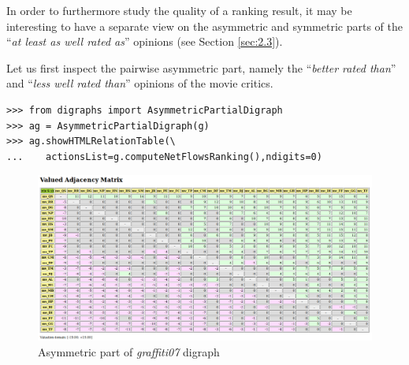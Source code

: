 In order to furthermore study the quality of a ranking result, it may be interesting to have a separate view on the asymmetric and symmetric parts of the ``\emph{at least as well rated as}'' opinions (see Section \vref{sec:2.3}).

Let us first inspect the pairwise asymmetric part, namely the ``\emph{better rated than}'' and ``\emph{less well rated than}'' opinions of the movie critics. 
\begin{lstlisting}
>>> from digraphs import AsymmetricPartialDigraph
>>> ag = AsymmetricPartialDigraph(g)
>>> ag.showHTMLRelationTable(\
...    actionsList=g.computeNetFlowsRanking(),ndigits=0)
\end{lstlisting}
\begin{figure}[h]
\includegraphics[width=12cm]{Figures/asymmetricPart.png}
\caption{Asymmetric part of \emph{graffiti07} digraph}
\label{fig:16.8}       %
\end{figure}

